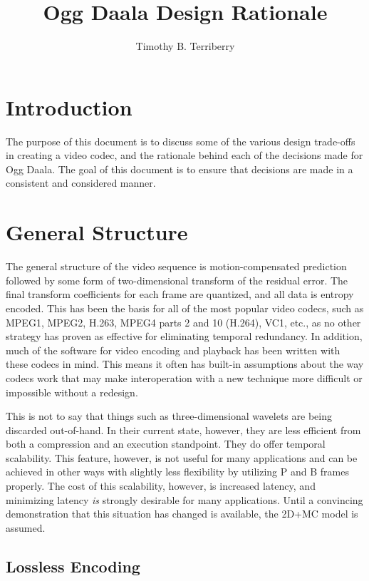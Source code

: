 \documentclass[11pt,letterpaper]{article}
\title{Ogg Daala Design Rationale}
\author{Timothy B. Terriberry}
\date{}
\begin{document}
\maketitle

\section{Introduction}

The purpose of this document is to discuss some of the various design
 trade-offs in creating a video codec, and the rationale behind each of the
 decisions made for Ogg Daala.
The goal of this document is to ensure that decisions are made in a consistent
 and considered manner.

\section{General Structure}

The general structure of the video sequence is motion-compensated prediction
 followed by some form of two-dimensional transform of the residual error.
The final transform coefficients for each frame are quantized, and all data is
 entropy encoded.
This has been the basis for all of the most popular video codecs, such as
 MPEG1, MPEG2, H.263, MPEG4 parts 2 and 10 (H.264), VC1, etc., as no other
 strategy has proven as effective for eliminating temporal redundancy.
In addition, much of the software for video encoding and playback has been
 written with these codecs in mind.
This means it often has built-in assumptions about the way codecs work that may
 make interoperation with a new technique more difficult or impossible without
 a redesign.

This is not to say that things such as three-dimensional wavelets are being
 discarded out-of-hand.
In their current state, however, they are less efficient from both a
 compression and an execution standpoint.
They do offer temporal scalability.
This feature, however, is not useful for many applications and can be achieved
 in other ways with slightly less flexibility by utilizing P and B frames
 properly.
The cost of this scalability, however, is increased latency, and minimizing
 latency \textit{is} strongly desirable for many applications.
Until a convincing demonstration that this situation has changed is available,
 the 2D+MC model is assumed.

\subsection{Lossless Encoding}
\end{document}
